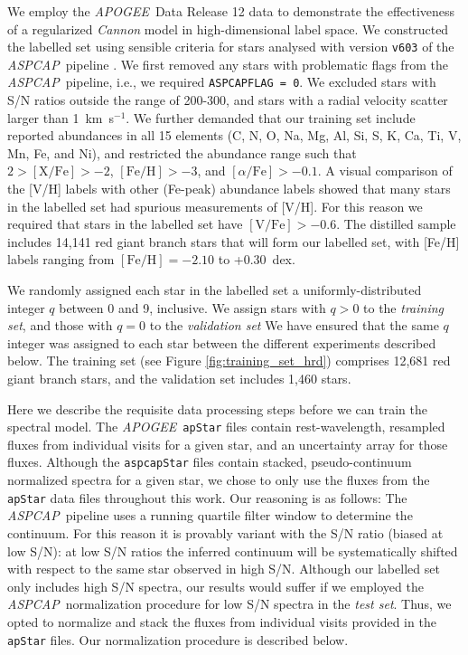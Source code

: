 \documentclass[12pt,preprint]{aastex}
\newcommand{\project}[1]{\textsl{#1}}
\newcommand{\acronym}[1]{{\small{#1}}}
\newcommand{\apogee}{\project{\acronym{APOGEE}}}
\newcommand{\aspcap}{\project{\acronym{ASPCAP}}}
\begin{document}
We employ the \apogee\ Data Release 12 data \citep{SDSS_DR12} to demonstrate the effectiveness of
a regularized \emph{Cannon} model in high-dimensional label space.  We 
constructed the labelled set using sensible criteria for stars analysed with 
version \texttt{v603} of the \aspcap\ pipeline \citep{Holtzman_16,Garcia_Perez_2016}.  We first removed 
any stars with problematic flags from the \aspcap\ pipeline, i.e., we required 
\texttt{ASPCAPFLAG~=~0}.  We excluded stars with S/N ratios outside the range of
200-300, and stars with a radial velocity scatter larger than 1~km~s$^{-1}$.  We
further demanded that our training set include reported abundances in all 15 
elements (C, N, O, Na, Mg, Al, Si, S, K, Ca, Ti, V, Mn, Fe, and Ni), and 
restricted the abundance range such that $2 > \mathrm{[X/Fe]} > -2$, 
$\mathrm{[Fe/H]} > -3$, and $[\alpha/\mathrm{Fe}] > -0.1$.  A visual comparison 
of the [V/H] labels with other (Fe-peak) abundance labels showed that many stars
in the labelled set had spurious measurements of [V/H].  For this reason we 
required that stars in the labelled set have $\mathrm{[V/Fe]} > -0.6$.  The 
distilled sample includes 14,141 red giant branch stars that will form our 
labelled set, with [Fe/H] labels ranging from $\mathrm{[Fe/H]} = -2.10$ to 
+0.30~dex.


We randomly assigned each star in the labelled set a uniformly-distributed 
integer $q$ between 0 and 9, inclusive.  We assign stars with $q > 0$
 to the \emph{training set}, and those with $q = 0$ to the \emph{validation set}
 We have ensured that the same $q$ integer was assigned to each star 
between the different experiments described below.  The training set (see Figure
\ref{fig:training_set_hrd}) comprises 12,681 red giant branch stars, and the 
validation set includes 1,460 stars.


Here we describe the requisite data processing steps before we can train the 
spectral model.  The \apogee\ \texttt{apStar} files contain rest-wavelength, 
resampled fluxes from individual visits for a given star, and an uncertainty array for
those fluxes.  Although the \texttt{aspcapStar} files contain stacked, 
pseudo-continuum normalized spectra for a given star, we chose to only use the 
fluxes from the \texttt{apStar} data files throughout this work.  Our reasoning 
is as follows: The \aspcap\ pipeline uses a running quartile filter window to determine 
the continuum.  For this reason it is provably variant with the S/N ratio (biased at low S/N): at 
low S/N ratios the inferred continuum will be systematically shifted with 
respect to the same star observed in high S/N.  Although our labelled set only 
includes high S/N spectra, our results would suffer if we employed the \aspcap\ 
normalization procedure for low S/N spectra in the \emph{test set}.  Thus, we 
opted to normalize and stack the fluxes from individual visits provided in the 
\texttt{apStar} files. Our normalization procedure is described below.
\end{document}

